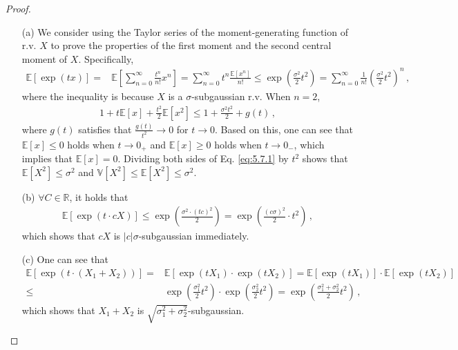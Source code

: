 \begin{proof}
	\begin{enumerate}
		\item[(a)] We consider using the Taylor series of the moment-generating function of r.v. $X$ to prove the properties of 
		the first moment and the second central moment of $X$. Specifically, 
		\begin{align*}
			\mathbb{E}[\exp(tx)]=&\mathbb{E}[\sum^{\infty}_{n=0}\frac{t^n}{n!}x^n]
			=\sum^{\infty}_{n=0}t^n\frac{\mathbb{E}[x^n]}{n!}
			\leq \exp(\frac{\sigma^2}{2}t^2)
			=\sum^{\infty}_{n=0}\frac{1}{n!}(\frac{\sigma^2}{2}t^2)^n\,,
		\end{align*}
		where the inequality is because $X$ is a $\sigma$-subgaussian r.v. When $n=2$, 
		\begin{align}\label{eq:5.7.1}
			1+t\mathbb{E}[x]+\frac{t^2}{2}\mathbb{E}[x^2]\leq 1+\frac{\sigma^2t^2}{2}+g(t)\,,
		\end{align}
		where $g(t)$ satisfies that $\frac{g(t)}{t^2}\rightarrow0$ for $t\rightarrow 0$. Based on this, 
		one can see that $\mathbb{E}[x]\leq 0$ holds when $t\rightarrow 0_{+}$ and 
		$\mathbb{E}[x]\geq 0$ holds when $t\rightarrow 0_{-}$, which implies that $\mathbb{E}[x]=0$. Dividing both sides of 
		Eq. \eqref{eq:5.7.1} by $t^2$ shows that $\mathbb{E}[X^2]\leq \sigma^2$ and $\mathbb{V}[X^2]\leq\mathbb{E}[X^2]\leq \sigma^2$.
		
		\item[(b)] $\forall C\in \mathbb{R}$, it holds that 
		\begin{align*}
			\mathbb{E}[\exp(t\cdot cX)]\leq \exp\left(\frac{\sigma^2\cdot (tc)^2}{2}\right)=\exp\left(\frac{(c\sigma)^2}{2}\cdot t^2\right)\,,
		\end{align*} 
		which shows that $cX$ is $|c|\sigma$-subgaussian immediately.
		\item[(c)] One can see that 
		\begin{align*}
			\mathbb{E}[\exp(t\cdot (X_1+X_2))]=&\mathbb{E}[\exp(tX_1)\cdot \exp(tX_2)]
			=\mathbb{E}[\exp(tX_1)]\cdot\mathbb{E}[\exp(tX_2)]\\
			\leq& \exp(\frac{\sigma_1^2}{2}t^2)\cdot\exp(\frac{\sigma_2^2}{2}t^2)
			= \exp(\frac{\sigma^2_1+\sigma^2_2}{2}t^2)\,,
		\end{align*} 
		which shows that $X_1+X_2$ is $\sqrt{\sigma^2_1+\sigma^2_2}$-subgaussian.
	\end{enumerate}
	\end{proof}



